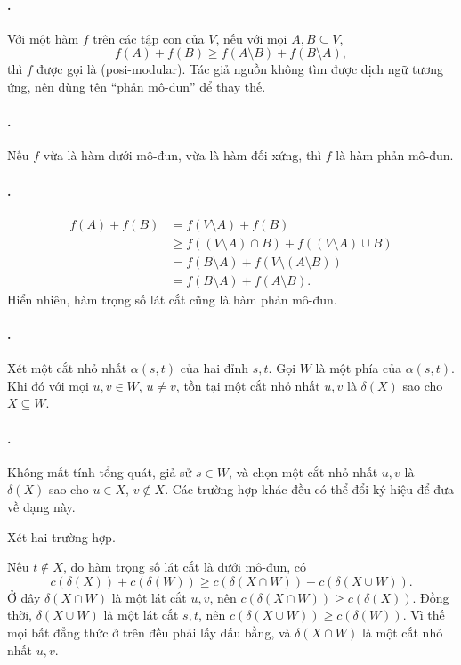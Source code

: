 \documentclass[11pt]{article}
\begin{document}
\paragraph{.}
Với một hàm \(f\) trên các tập con của \(V\), nếu với mọi \(A,B\subseteq V\),
\[
  f(A)+f(B)\ge f(A\setminus B)+f(B\setminus A),
\]
thì \(f\) được gọi là  (posi-modular). Tác giả nguồn
không tìm được dịch ngữ tương ứng, nên dùng tên ``phản mô-đun'' để thay thế.

\paragraph{.}
Nếu \(f\) vừa là hàm dưới mô-đun, vừa là hàm đối xứng, thì \(f\) là hàm phản
mô-đun.

\paragraph{.}
\[
\begin{aligned}
  f(A)+f(B)
  &= f(V\setminus A)+f(B)\\
  &\ge f((V\setminus A)\cap B)+f((V\setminus A)\cup B)\\
  &= f(B\setminus A)+f(V\setminus(A\setminus B))\\
  &= f(B\setminus A)+f(A\setminus B).
\end{aligned}
\]
Hiển nhiên, hàm trọng số lát cắt cũng là hàm phản mô-đun.

\paragraph{.}
Xét một cắt nhỏ nhất \(\alpha(s,t)\) của hai đỉnh \(s,t\). Gọi \(W\) là một
phía của \(\alpha(s,t)\). Khi đó với mọi \(u,v\in W\), \(u\ne v\), tồn tại
một cắt nhỏ nhất \(u,v\) là \(\delta(X)\) sao cho \(X\subseteq W\).

\paragraph{.}
Không mất tính tổng quát, giả sử \(s\in W\), và chọn một cắt nhỏ nhất
\(u,v\) là \(\delta(X)\) sao cho \(u\in X\), \(v\notin X\). Các trường hợp
khác đều có thể đổi ký hiệu để đưa về dạng này.

Xét hai trường hợp.

Nếu \(t\notin X\), do hàm trọng số lát cắt là dưới mô-đun, có
\[
  c(\delta(X))+c(\delta(W))
  \ge c(\delta(X\cap W))+c(\delta(X\cup W)).
\]
Ở đây \(\delta(X\cap W)\) là một lát cắt \(u,v\), nên
\(c(\delta(X\cap W))\ge c(\delta(X))\). Đồng thời, \(\delta(X\cup W)\) là một
lát cắt \(s,t\), nên \(c(\delta(X\cup W))\ge c(\delta(W))\). Vì thế mọi bất
đẳng thức ở trên đều phải lấy dấu bằng, và \(\delta(X\cap W)\) là một cắt nhỏ
nhất \(u,v\).
\end{document}
